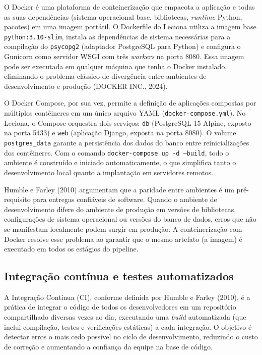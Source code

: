 O Docker é uma plataforma de conteinerização que empacota a aplicação e todas as suas dependências (sistema operacional base, bibliotecas, \textit{runtime} Python, pacotes) em uma imagem portátil. O Dockerfile do Leciona utiliza a imagem base \texttt{python:3.10-slim}, instala as dependências de sistema necessárias para a compilação do \texttt{psycopg2} (adaptador PostgreSQL para Python) e configura o Gunicorn como servidor WSGI com três \textit{workers} na porta 8080. Essa imagem pode ser executada em qualquer máquina que tenha o Docker instalado, eliminando o problema clássico de divergência entre ambientes de desenvolvimento e produção (DOCKER INC., 2024).

O Docker Compose, por sua vez, permite a definição de aplicações compostas por múltiplos contêineres em um único arquivo YAML (\texttt{docker-compose.yml}). No Leciona, o Compose orquestra dois serviços: \texttt{db} (PostgreSQL 15 Alpine, exposto na porta 5433) e \texttt{web} (aplicação Django, exposta na porta 8080). O volume \texttt{postgres\_data} garante a persistência dos dados do banco entre reinicializações dos contêineres. Com o comando \texttt{docker-compose up -d --build}, todo o ambiente é construído e iniciado automaticamente, o que simplifica tanto o desenvolvimento local quanto a implantação em servidores remotos.

Humble e Farley (2010) argumentam que a paridade entre ambientes é um pré-requisito para entregas confiáveis de software. Quando o ambiente de desenvolvimento difere do ambiente de produção em versões de bibliotecas, configurações de sistema operacional ou versões do banco de dados, erros que não se manifestam localmente podem surgir em produção. A conteinerização com Docker resolve esse problema ao garantir que o mesmo artefato (a imagem) é executado em todos os estágios do pipeline.

\subsection{Integração contínua e testes automatizados}

A Integração Contínua (CI), conforme definida por Humble e Farley (2010), é a prática de integrar o código de todos os desenvolvedores em um repositório compartilhado diversas vezes ao dia, executando uma \textit{build} automatizada (que inclui compilação, testes e verificações estáticas) a cada integração. O objetivo é detectar erros o mais cedo possível no ciclo de desenvolvimento, reduzindo o custo de correção e aumentando a confiança da equipe na base de código.

